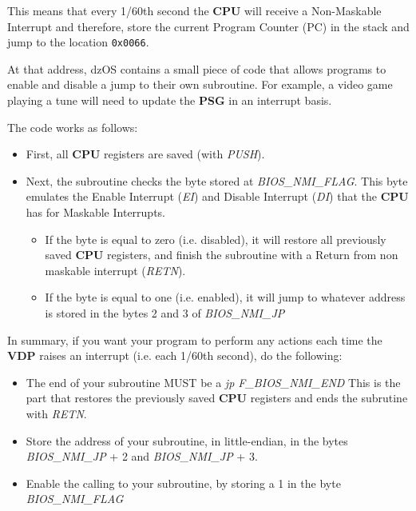 \documentclass[a4paper,11pt]{article}
\begin{document}
    This means that every 1/60th second the \textbf{CPU} will receive a
    Non-Maskable Interrupt and therefore, store the current Program Counter (PC)
    in the stack and jump to the location \texttt{0x0066}.

    At that address, dzOS contains a small piece of code that allows programs to
    enable and disable a jump to their own subroutine. For example, a video game
    playing a tune will need to update the \textbf{PSG} in an interrupt basis.

    The code works as follows:

    \begin{itemize}
        \item First, all \textbf{CPU} registers are saved (with \textit{PUSH}).
        \item Next, the subroutine checks the byte stored at
        \textit{BIOS\_NMI\_FLAG}. This byte emulates the Enable Interrupt
        (\textit{EI}) and Disable Interrupt (\textit{DI}) that the \textbf{CPU}
        has for Maskable Interrupts.
        \begin{itemize}
            \item If the byte is equal to zero (i.e. disabled), it will restore
            all previously saved \textbf{CPU} registers, and finish the
            subroutine with a Return from non maskable interrupt (\textit{RETN}).
            \item If the byte is equal to one (i.e. enabled), it will jump to
            whatever address is stored in the bytes 2 and 3 of
            \textit{BIOS\_NMI\_JP}
        \end{itemize}
    \end{itemize}

    In summary, if you want your program to perform any actions each time the
    \textbf{VDP} raises an interrupt (i.e. each 1/60th second), do the following:

    \begin{itemize}
        \item The end of your subroutine MUST be a \textit{jp F\_BIOS\_NMI\_END}
        This is the part that restores the previously saved \textbf{CPU}
        registers and ends the subrutine with \textit{RETN}.
        \item Store the address of your subroutine, in little-endian, in the
        bytes \textit{BIOS\_NMI\_JP} + 2 and \textit{BIOS\_NMI\_JP} + 3.
        \item Enable the calling to your subroutine, by storing a 1 in the byte
        \textit{BIOS\_NMI\_FLAG}
    \end{itemize}
\end{document}
